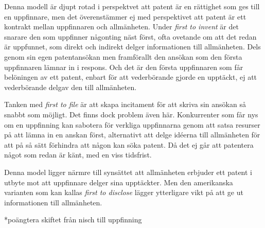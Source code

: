 Denna modell är djupt rotad i perspektvet att patent är en rättighet som ges till en uppfinnare, men det överenstämmer ej med perspektivet att patent är ett kontrakt mellan uppfinnaren och allmänheten. Under \emph{first to invent} är det snarare den som uppfinner någonting näst först, ofta ovetande om att det redan är uppfunnet, som direkt och indirekt delger informationen till allmänheten. Dels genom sin egen patentansökan men framförallt den ansökan som den första uppfinnaren lämnar in i respons. Och det är den första uppfinnaren som får belöningen av ett patent, enbart för att vederbörande gjorde en upptäckt, ej att vederbörande delgav den till allmänheten.

Tanken med \emph{first to file} är att skapa incitament för att skriva sin ansökan så snabbt som möjligt. Det finns dock problem även här. Konkurrenter som får nys om en uppfinning kan sabotera för verkliga uppfinnarna genom att satsa resurser på att lämna in en anskan först, alternativt att delge idéerna till allmänheten för att på så sätt förhindra att någon kan söka patent. Då det ej går att patentera något som redan är känt, med en viss tidsfrist.

Denna model ligger närmre till synsättet att allmänheten erbjuder ett patent i utbyte mot att uppfinnare delger sina upptäckter. Men den amerikanska varianten som kan kallas \emph{first to disclose} lägger ytterligare vikt på att ge ut informationen till allmänheten. 


*poängtera skiftet från nisch till uppfinning